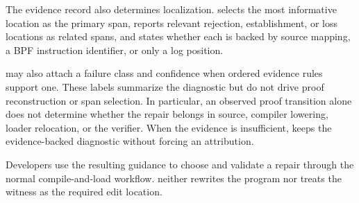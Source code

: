The evidence record also determines localization. \sys selects the most informative location as the primary span, reports relevant rejection, establishment, or loss locations as related spans, and states whether each is backed by source mapping, a BPF instruction identifier, or only a log position.

\sys may also attach a failure class and confidence when ordered evidence rules support one. These labels summarize the diagnostic but do not drive proof reconstruction or span selection. In particular, an observed proof transition alone does not determine whether the repair belongs in source, compiler lowering, loader relocation, or the verifier. When the evidence is insufficient, \sys keeps the evidence-backed diagnostic without forcing an attribution.

Developers use the resulting guidance to choose and validate a repair through the normal compile-and-load workflow. \sys neither rewrites the program nor treats the witness as the required edit location.